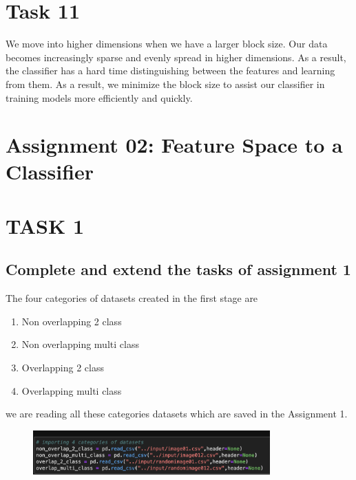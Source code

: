 \documentclass[conference]{IEEEtran}
\begin{document}
\section{Task 11}

We move into higher dimensions when we have a larger block size. Our data becomes increasingly sparse and evenly spread in higher dimensions. As a result, the classifier has a hard time distinguishing between the features and learning from them. As a result, we minimize the block size to assist our classifier in training models more efficiently and quickly.\\
\pagebreak
\maketitle
\section{Assignment 02: Feature Space to a Classifier}
\section{TASK 1 }
\subsection{Complete and extend the tasks of assignment 1}
The four categories of datasets created in the first stage are
\begin{enumerate}
\item
Non overlapping 2 class 
\item
Non overlapping multi class
\item
Overlapping 2 class
\item
Overlapping multi class
\end{enumerate}
we are reading all these categories datasets which are saved in the Assignment 1.
\begin{figure}[!htbp]
    \centering
    \includegraphics[height=1.7cm]{task1.1.png} 
   
    \label{fig:my_label}
\end{figure}
\end{document}

